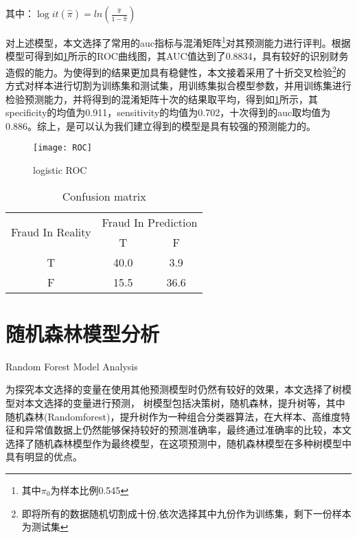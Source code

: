 其中：$\log it(\hat \pi ) = ln(\frac{{\hat \pi }}{{1 - \hat \pi }})$

对上述模型，本文选择了常用的auc指标与混淆矩阵\footnote{其中$\pi_{0}$为样本比例0.545}对其预测能力进行评判。根据模型可得到如\cref{ROC}所示的ROC曲线图，其AUC值达到了0.8834，具有较好的识别财务造假的能力。为使得到的结果更加具有稳健性，本文接着采用了十折交叉检验\footnote{即将所有的数据随机切割成十份,依次选择其中九份作为训练集，剩下一份样本为测试集}的方式对样本进行切割为训练集和测试集，用训练集拟合模型参数，并用训练集进行检验预测能力，并将得到的混淆矩阵十次的结果取平均，得到如\cref{Confusion matrix}所示，其specificity的均值为0.911，sensitivity的均值为0.702，十次得到的auc取均值为0.886。综上，是可以认为我们建立得到的模型是具有较强的预测能力的。

\begin{figure}[!ht]
    \centering
    \texttt{[image: ROC]}
    \caption{logistic ROC} \label{ROC}
    \end{figure}

\begin{table}[!ht]
    \centering
    \caption{Confusion matrix}
    \label{Confusion matrix}
    \begin{tabular}{ccc}
        \toprule
    \multirow{2}{*}{Fraud In Reality} & \multicolumn{2}{c}{Fraud In Prediction} \\ \cline{2-3} 
                                      & T                  & F                  \\ \toprule
    T                                 & 40.0               & 3.9                \\
    F                                 & 15.5               & 36.6               \\ \bottomrule
    \end{tabular}
    \end{table}


\section{随机森林模型分析}{Random Forest Model Analysis}

为探究本文选择的变量在使用其他预测模型时仍然有较好的效果，本文选择了树模型对本文选择的变量进行预测，%
树模型包括决策树，随机森林，提升树等，其中随机森林(Randomforest)，提升树作为一种组合分类器算法，在大样本、高维度特征和异常值数据上仍然能够保持较好的预测准确率，最终通过准确率的比较，本文选择了随机森林模型作为最终模型，在这项预测中，随机森林模型在多种树模型中具有明显的优点。

